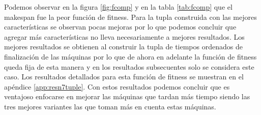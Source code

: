 Podemos observar en la figura \ref{fig:fcomp} y en la tabla \ref{tab:fcomp} que el makespan fue la peor función de fitness. Para la tupla construida con las mejores características se observan pocas mejoras por lo que podemos concluir que agregar más características no lleva necesariamente a mejores resultados. Los mejores resultados se obtienen al construir la tupla de tiempos ordenados de finalización de las máquinas por lo que de ahora en adelante la función de fitness queda fija de esta manera y en los resultados subsecuentes solo se considera este caso. Los resultados detallados para esta función de fitness se muestran en el apéndice \ref{app:resn7tuple}.
Con estos resultados podemos concluir que es ventajoso enfocarse en mejorar las máquinas que tardan más tiempo siendo las tres mejores variantes las que toman más en cuenta estas máquinas.


